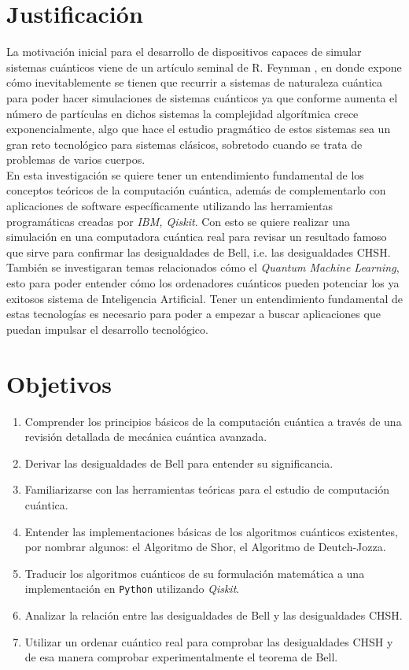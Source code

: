 \documentclass[a4paper]{article}
\begin{document}
\section{Justificación}
La motivación inicial para el desarrollo de dispositivos capaces de simular sistemas cuánticos viene de un artículo seminal de R. Feynman \cite{Feynman}, en donde expone cómo inevitablemente se tienen que recurrir a sistemas de naturaleza cuántica para poder hacer simulaciones de sistemas cuánticos ya que conforme aumenta el número de partículas en dichos sistemas la complejidad algorítmica crece exponencialmente, algo que hace el estudio pragmático de estos sistemas sea un gran reto tecnológico para sistemas clásicos, sobretodo cuando se trata de problemas de varios cuerpos.\\

En esta investigación se quiere tener un entendimiento fundamental de los conceptos teóricos de la computación cuántica, además de complementarlo con aplicaciones de software específicamente utilizando las herramientas programáticas creadas por \textit{IBM, Qiskit}. Con esto se quiere realizar una simulación en una computadora cuántica real para revisar un resultado famoso que sirve para confirmar las desigualdades de Bell, i.e. las desigualdades CHSH.\\

También se investigaran temas relacionados cómo el \textit{Quantum Machine Learning}, esto para poder entender cómo los ordenadores cuánticos pueden potenciar los ya exitosos sistema de Inteligencia Artificial. Tener un entendimiento fundamental de estas tecnologías es necesario para poder a empezar a buscar aplicaciones que puedan impulsar el desarrollo tecnológico.
\section{Objetivos}
\begin{enumerate}
\item Comprender los principios básicos de la computación cuántica a través de una revisión detallada de mecánica cuántica avanzada.
\item Derivar las desigualdades de Bell para entender su significancia.
\item Familiarizarse con las herramientas teóricas para el estudio de computación cuántica.
\item Entender las implementaciones básicas de los algoritmos cuánticos existentes, por nombrar algunos: el Algoritmo de Shor, el Algoritmo de Deutch-Jozza.
\item Traducir los algoritmos cuánticos de su formulación matemática a una implementación en \texttt{Python} utilizando \textit{Qiskit}.
\item Analizar la relación entre las desigualdades de Bell y las desigualdades CHSH.
\item Utilizar un ordenar cuántico real para comprobar las desigualdades CHSH y de esa manera comprobar experimentalmente el teorema de Bell.

\end{enumerate}
\end{document}
